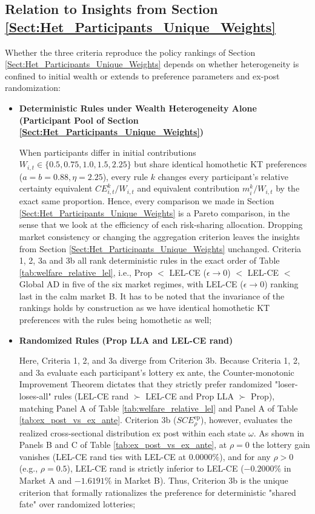 \documentclass[11pt,a4paper]{article}
\theoremstyle{definition}
\theoremstyle{plain}
\theoremstyle{remark}
\newcommand{\1}{\mathbf{1}}
\begin{document}
\subsection{Relation to Insights from Section \ref{Sect:Het_Participants_Unique_Weights}}
Whether the three criteria reproduce the policy rankings of Section \ref{Sect:Het_Participants_Unique_Weights} depends on whether heterogeneity is confined to initial wealth or extends to preference parameters and ex-post randomization:
\begin{itemize}
    \item \textbf{Deterministic Rules under Wealth Heterogeneity Alone (Participant Pool of Section \ref{Sect:Het_Participants_Unique_Weights})}
    
    When participants differ in initial contributions $W_{i,t} \in \{0.5, 0.75, 1.0, 1.5, 2.25\}$ but share identical homothetic KT preferences ($a = b = 0.88, \eta = 2.25$), every rule $k$ changes every participant's relative certainty equivalent $CE_{i,t}^k / W_{i,t}$ and equivalent contribution $m_i^k / W_{i,t}$ by the exact same proportion. Hence, every comparison we made in Section \ref{Sect:Het_Participants_Unique_Weights} is a Pareto comparison, in the sense that we look at the efficiency of each risk-sharing allocation. Dropping market consistency or changing the aggregation criterion leaves the insights from Section \ref{Sect:Het_Participants_Unique_Weights} unchanged. Criteria 1, 2, 3a and 3b all rank deterministic rules in the exact order of Table \ref{tab:welfare_relative_lel}, i.e., Prop $<$ LEL-CE ($\epsilon \to 0$) $<$ LEL-CE $<$ Global AD in five of the six market regimes, with LEL-CE ($\epsilon \to 0$) ranking last in the calm market B. It has to be noted that the invariance of the rankings holds by construction as we have identical homothetic KT preferences with the rules being homothetic as well;
    \item \textbf{Randomized Rules (Prop LLA and LEL-CE rand)}
    
    Here, Criteria 1, 2, and 3a diverge from Criterion 3b. Because Criteria 1, 2, and 3a evaluate each participant's lottery ex ante, the Counter-monotonic Improvement Theorem \citep{Lauzier2024} dictates that they strictly prefer randomized "loser-loses-all" rules (LEL-CE rand $\succ$ LEL-CE and Prop LLA $\succ$ Prop), matching Panel A of Table \ref{tab:welfare_relative_lel} and Panel A of Table \ref{tab:ex_post_vs_ex_ante}. Criterion 3b ($SCE_\rho^{\text{ep}}$), however, evaluates the realized cross-sectional distribution ex post within each state $\omega$. As shown in Panels B and C of Table \ref{tab:ex_post_vs_ex_ante}, at $\rho = 0$ the lottery gain vanishes (LEL-CE rand ties with LEL-CE at $0.0000\%$), and for any $\rho > 0$ (e.g., $\rho = 0.5$), LEL-CE rand is strictly inferior to LEL-CE ($-0.2000\%$ in Market A and $-1.6191\%$ in Market B). Thus, Criterion 3b is the unique criterion that formally rationalizes the preference for deterministic "shared fate" over randomized lotteries;


\end{itemize}
\end{document}
